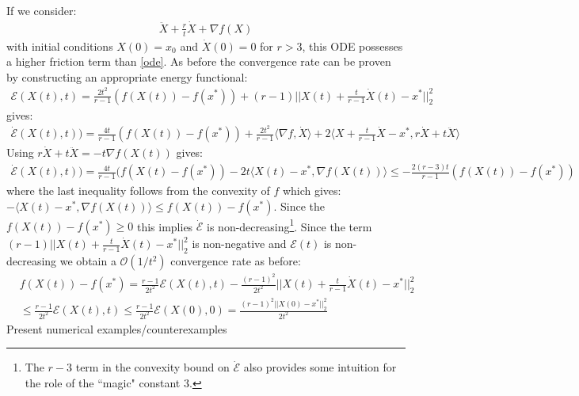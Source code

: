 If we consider:
\begin{align}
    \ddot{X} + \frac{r}{t} \dot{X} + \nabla f(X) \label{highfrictionode}
\end{align}
with initial conditions $X(0) = x_0$ and $\dot{X}(0) = 0$ for $r>3$, this ODE possesses a higher friction term than \eqref{ode}. As before the convergence rate can be proven by constructing an appropriate energy functional:
\begin{align*}
    \mathcal{E}(X(t), t) = \frac{2t^2}{r-1} \left( f(X(t)) -f(x^*) \right) + (r-1) ||X(t) + \frac{t}{r-1}\dot{X}(t) -x^*||_2^2
\end{align*}
gives:
\begin{align*}
    \dot{\mathcal{E}}(X(t), t)) = \frac{4t}{r-1}(f(X(t)) - f(x^*)) + \frac{2t^2}{r-1} \langle \nabla f, \dot{X} \rangle + 2 \langle X + \frac{t}{r-1} \dot{X} - x^*, r \dot{X} + t \ddot{X} \rangle
\end{align*}
Using $r\dot{X} + t \ddot{X} = -t \nabla f(X(t))$ gives:
\begin{align*}
    \dot{\mathcal{E}}(X(t), t)) = \frac{4t}{r-1} (f(X(t) - f(x^*)) - 2t \langle X(t) - x^*, \nabla f(X(t)) \rangle \leq - \frac{2(r-3)t}{r-1}(f(X(t))-f(x^*))
\end{align*}
where the last inequality follows from the convexity of $f$ which gives: $-\langle X(t) - x^*, \nabla f(X(t)) \rangle \leq f(X(t)) - f(x^*)$. Since the $f(X(t)) - f(x^*) \geq 0$ this implies $\dot{\mathcal{E}}$ is non-decreasing\footnote{The $r-3$ term in the convexity bound on $\dot{\mathcal{E}}$ also provides some intuition for the role of the ``magic" constant $3$.}. Since the term $(r-1) ||X(t) + \frac{t}{r-1} \dot{X}(t) - x^*||_2^2$ is non-negative and $\mathcal{E}(t)$ is non-decreasing we obtain a $\mathcal{O}(1/t^2)$ convergence rate as before:
\begin{align*}
    & f(X(t)) - f(x^*) = \frac{r-1}{2t^2} \mathcal{E}(X(t), t) - \frac{(r-1)^2}{2t^2} ||X(t) + \frac{t}{r-1} \dot{X}(t) - x^*||_2^2 \\
    & \leq \frac{r-1}{2t^2} \mathcal{E}(X(t), t) \leq \frac{r-1}{2t^2} \mathcal{E}(X(0), 0) = \frac{(r-1)^2 ||X(0)-x^*||_2^2}{2 t^2}
\end{align*}
Present numerical examples/counterexamples
 
